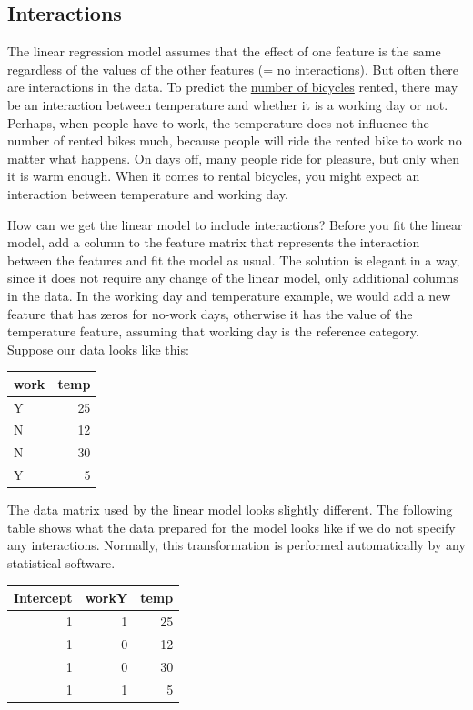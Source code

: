 \documentclass[
  12pt,
]{krantz}
\begin{document}
\hypertarget{lm-interact}{%
\subsection{Interactions}\label{lm-interact}}

The linear regression model assumes that the effect of one feature is the same regardless of the values of the other features (= no interactions).
But often there are interactions in the data.
To predict the \protect\hyperlink{bike-data}{number of bicycles} rented, there may be an interaction between temperature and whether it is a working day or not.
Perhaps, when people have to work, the temperature does not influence the number of rented bikes much, because people will ride the rented bike to work no matter what happens.
On days off, many people ride for pleasure, but only when it is warm enough.
When it comes to rental bicycles, you might expect an interaction between temperature and working day.

How can we get the linear model to include interactions?
Before you fit the linear model, add a column to the feature matrix that represents the interaction between the features and fit the model as usual.
The solution is elegant in a way, since it does not require any change of the linear model, only additional columns in the data.
In the working day and temperature example, we would add a new feature that has zeros for no-work days, otherwise it has the value of the temperature feature, assuming that working day is the reference category.
Suppose our data looks like this:

\begin{tabular}{l|r}
\hline
work & temp\\
\hline
Y & 25\\
\hline
N & 12\\
\hline
N & 30\\
\hline
Y & 5\\
\hline
\end{tabular}

The data matrix used by the linear model looks slightly different.
The following table shows what the data prepared for the model looks like if we do not specify any interactions.
Normally, this transformation is performed automatically by any statistical software.

\begin{tabular}{r|r|r}
\hline
Intercept & workY & temp\\
\hline
1 & 1 & 25\\
\hline
1 & 0 & 12\\
\hline
1 & 0 & 30\\
\hline
1 & 1 & 5\\
\hline
\end{tabular}
\end{document}
